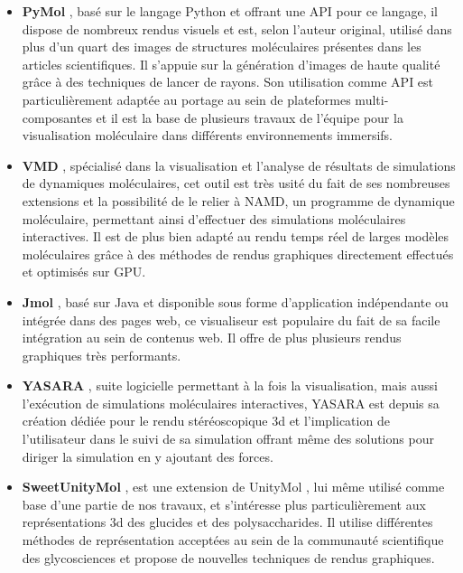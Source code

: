 \begin{itemize}
  \item \textbf{PyMol} \cite{delano_pymol_2002}, basé sur le langage Python et offrant une API pour ce langage, il dispose de nombreux rendus visuels et est, selon l'auteur original, utilisé dans plus d'un quart des images de structures moléculaires présentes dans les articles scientifiques. Il s'appuie sur la génération d'images de haute qualité grâce à des techniques de lancer de rayons. Son utilisation comme API est particulièrement adaptée au portage au sein de plateformes multi-composantes et il est la base de plusieurs travaux de l'équipe pour la visualisation moléculaire dans différents environnements immersifs.
  \item \textbf{VMD} \cite{humphrey_vmd:_1996}, spécialisé dans la visualisation et l'analyse de résultats de simulations de dynamiques moléculaires, cet outil est très usité du fait de ses nombreuses extensions et la possibilité de le relier à NAMD, un programme de dynamique moléculaire, permettant ainsi d'effectuer des simulations moléculaires interactives. Il est de plus bien adapté au rendu temps réel de larges modèles moléculaires grâce à des méthodes de rendus graphiques directement effectués et optimisés sur GPU.
  \item \textbf{Jmol} \cite{herraez2006biomolecules}, basé sur Java et disponible sous forme d'application indépendante ou intégrée dans des pages web, ce visualiseur est populaire du fait de sa facile intégration au sein de contenus web. Il offre de plus plusieurs rendus graphiques très performants.
  \item \textbf{YASARA} \cite{krieger2014yasara}, suite logicielle permettant à la fois la visualisation, mais aussi l’exécution de simulations moléculaires interactives, YASARA est depuis sa création dédiée pour le rendu stéréoscopique 3d et l'implication de l'utilisateur dans le suivi de sa simulation offrant même des solutions pour diriger la simulation en y ajoutant des forces.
  \item \textbf{SweetUnityMol} \cite{perez2015three}, est une extension de UnityMol \cite{lv2013game}, lui même utilisé comme base d'une partie de nos travaux, et s'intéresse plus particulièrement aux représentations 3d des glucides et des polysaccharides. Il utilise différentes méthodes de représentation acceptées au sein de la communauté scientifique des glycosciences et propose de nouvelles techniques de rendus graphiques.
\end{itemize}

